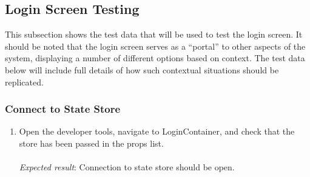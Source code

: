 \subsection{Login Screen Testing} %
\label{sub:login_screen_testing}
This subsection shows the test data that will be used to test the login screen. It should be noted that the login screen serves as a ``portal'' to other aspects of the system, displaying a number of different options based on context. The test data below will include full details of how such contextual situations should be replicated.

\subsubsection{Connect to State Store} %
\label{ssub:connect_to_state_store}
\begin{enumerate}[leftmargin=*]
\item Open the developer tools, navigate to LoginContainer, and check that the store has been passed in the props list.\\\\
\textit{Expected result}: Connection to state store should be open.
\end{enumerate}

